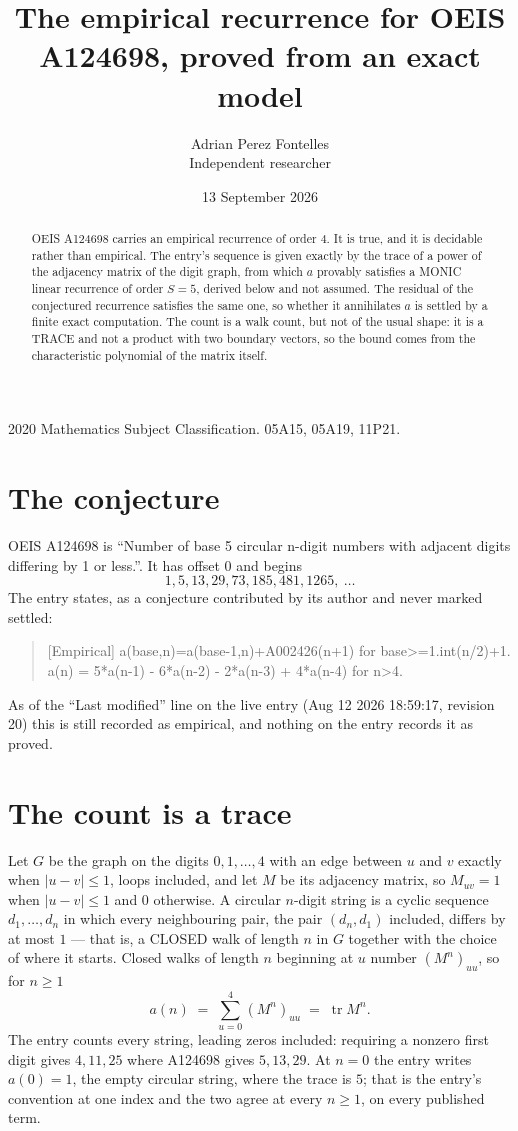 \documentclass[11pt,a4paper]{article}
\title{The empirical recurrence for OEIS A124698, proved from an exact model}
\author{Adrian Perez Fontelles\\ \small Independent researcher}
\date{13 September 2026}
\theoremstyle{plain}
\theoremstyle{definition}
\begin{document}
\maketitle

\begin{abstract}
OEIS A124698 carries an empirical recurrence of order $4$. It is true, and it is
decidable rather than empirical. The entry's sequence is given exactly by the trace of a power of the adjacency matrix of the digit graph, from
which $a$ provably satisfies a MONIC linear recurrence of order $S=5$, derived below and not
assumed. The residual of the conjectured recurrence satisfies the same one, so whether it
annihilates $a$ is settled by a finite exact computation. The count is a walk count, but not of the usual shape: it is a TRACE and not a product with two boundary vectors, so the bound comes from the characteristic polynomial of the matrix itself.
\end{abstract}

\noindent\small 2020 Mathematics Subject Classification. 05A15, 05A19, 11P21.\normalsize

\section{The conjecture}

OEIS A124698 is ``Number of base 5 circular n-digit numbers with adjacent digits differing by 1 or less.''. It has offset $0$ and begins
\[
1, 5, 13, 29, 73, 185, 481, 1265,\ \dots
\]
The entry states, as a conjecture contributed by its author and never marked settled:
\begin{quote}
[Empirical] a(base,n)=a(base-1,n)+A002426(n+1) for base>=1.int(n/2)+1. a(n) = 5*a(n-1) - 6*a(n-2) - 2*a(n-3) + 4*a(n-4) for n>4.
\end{quote}
As of the ``Last modified'' line on the live entry (Aug 12 2026 18:59:17, revision 20)
this is still recorded as empirical, and nothing on the entry records it as proved.

\section{The count is a trace}

Let $G$ be the graph on the digits $0,1,\dots,4$ with an edge between $u$ and $v$ exactly
when $|u-v|\le1$, loops included, and let $M$ be its adjacency matrix, so $M_{uv}=1$ when
$|u-v|\le1$ and $0$ otherwise. A circular $n$-digit string is a cyclic sequence
$d_1,\dots,d_n$ in which every neighbouring pair, the pair $(d_n,d_1)$ included, differs by at
most $1$ --- that is, a CLOSED walk of length $n$ in $G$ together with the choice of where it
starts. Closed walks of length $n$ beginning at $u$ number $(M^n)_{uu}$, so for $n\ge1$
\[
a(n)\;=\;\sum_{u=0}^{4}(M^{n})_{uu}\;=\;\operatorname{tr}M^{n} .
\]
The entry counts every string, leading zeros included: requiring a nonzero first digit gives
$4,11,25$ where A124698 gives $5,13,29$. At $n=0$ the entry writes $a(0)=1$, the empty circular
string, where the trace is $5$; that is the entry's convention at one index and the two agree
at every $n\ge1$, on every published term.
\end{document}
